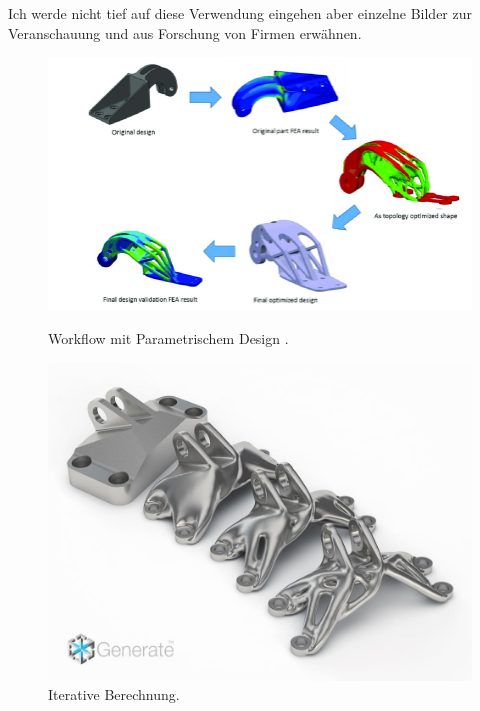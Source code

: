 \documentclass{article}
\begin{document}
    Ich werde nicht tief auf diese Verwendung eingehen aber einzelne Bilder zur 
    Veranschauung und aus Forschung von Firmen erw\"ahnen. 


    \begin{figure}[H]
        \begin{minipage}{0.4\textwidth}
           \centering
           \vfill
           \includegraphics[width=\linewidth]{figures/beispiele/gebisa-topo-workflow.png}
           \caption{Workflow mit Parametrischem Design \parencite{gebisa2017}.}
           \label{fig:ing-1}
        \end{minipage}
            \hfill
        \begin{minipage}{0.4\textwidth}
           \centering
           \vfill
           \includegraphics[width=\linewidth]{figures/beispiele/topo-ingeneur-2.jpg}
           \caption{Iterative Berechnung.}
           \label{fig:ing-2}
        \end{minipage}
    \end{figure}
\end{document}
